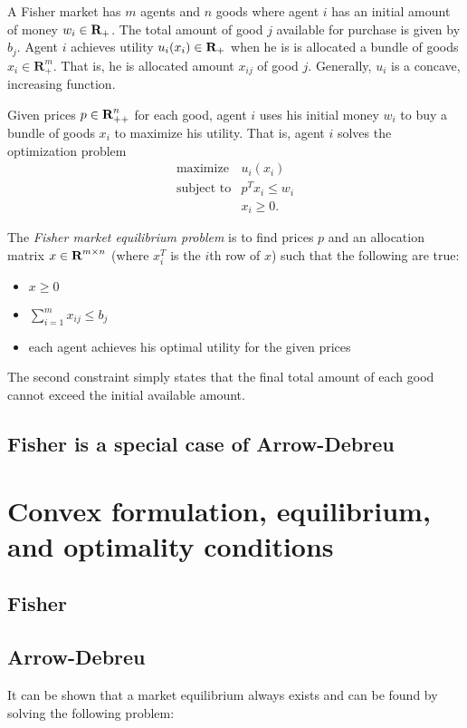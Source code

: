 \documentclass{article}
\begin{document}
A Fisher market has $m$ agents and $n$ goods where
agent $i$ has an initial amount of money $w_i \in {\mbox{\bf R}}_+$.
The total amount of good $j$ available for purchase is given by $b_j$.
Agent $i$ achieves utility $u_i(x_i) \in {\mbox{\bf R}}_+$ when he is is allocated a bundle of goods $x_i \in \mathbf{R}^m_{+}$. That is, he is allocated amount $x_{ij}$ of good $j$.
Generally, $u_i$ is a concave, increasing function.

Given prices $p \in {\mbox{\bf R}}^n_{++}$ for each good, agent $i$ uses his initial money $w_i$ to buy a bundle of goods $x_i$ to maximize his utility. That is, agent $i$ solves the optimization problem
\[
\begin{array}{ll}
\mbox{maximize} & u_i(x_i) \\
\mbox{subject to} & p^T x_i \leq w_i \\
& x_i \geq 0.
\end{array}
\]

The \emph{Fisher market equilibrium problem} is to find prices $p$ and an allocation matrix $x \in {\mbox{\bf R}}^{m \times n}$ (where $x_i^T$ is the $i$th row of $x$) such that the following are true:
\begin{itemize}
\item $x \geq 0$
\item $\sum_{i=1}^m x_{ij} \leq b_j$
\item each agent achieves his optimal utility for the given prices
\end{itemize}

The second constraint simply states that the final total amount of each good cannot exceed the initial available amount.

\subsection{Fisher is a special case of Arrow-Debreu}

\section{Convex formulation, equilibrium, and optimality conditions}
\subsection{Fisher}
\subsection{Arrow-Debreu}
It can be shown that a market equilibrium always exists and can be found by solving the
following problem:
\end{document}
